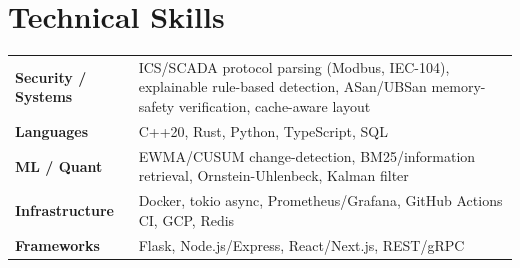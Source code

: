 \documentclass[10pt]{article}
\begin{document}
\section*{Technical Skills}
\noindent
\begin{tabular}{@{}p{2.7cm}p{15.5cm}@{}}
\textbf{Security / Systems} & ICS/SCADA protocol parsing (Modbus, IEC-104), explainable rule-based detection, ASan/UBSan memory-safety verification, cache-aware layout \\
\textbf{Languages} & C++20, Rust, Python, TypeScript, SQL \\
\textbf{ML / Quant} & EWMA/CUSUM change-detection, BM25/information retrieval, Ornstein-Uhlenbeck, Kalman filter \\
\textbf{Infrastructure} & Docker, tokio async, Prometheus/Grafana, GitHub Actions CI, GCP, Redis \\
\textbf{Frameworks} & Flask, Node.js/Express, React/Next.js, REST/gRPC \\
\end{tabular}
\end{document}
